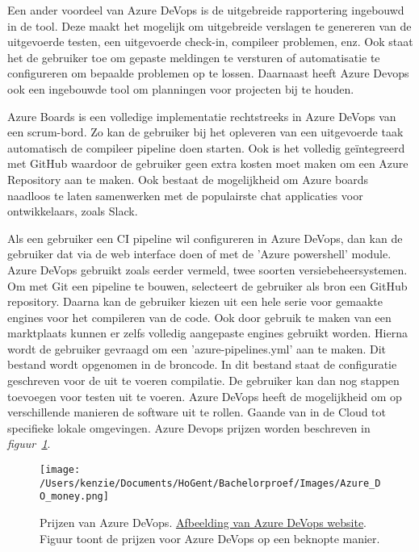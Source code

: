 Een ander voordeel van Azure DeVops is de uitgebreide rapportering ingebouwd in de tool. Deze maakt het mogelijk om uitgebreide verslagen te genereren van de uitgevoerde testen, een uitgevoerde check-in, compileer problemen, enz. Ook staat het de gebruiker toe om gepaste meldingen te versturen of automatisatie te configureren om bepaalde problemen op te lossen. Daarnaast heeft Azure Devops ook een ingebouwde tool om planningen voor projecten bij te houden.

Azure Boards is een volledige implementatie rechtstreeks in Azure DeVops van een scrum-bord. Zo kan de gebruiker bij het opleveren van een uitgevoerde taak automatisch de compileer pipeline doen starten. Ook is het volledig geïntegreerd met GitHub waardoor de gebruiker geen extra kosten moet maken om een Azure Repository aan te maken. Ook bestaat de mogelijkheid om Azure boards naadloos te laten samenwerken met de populairste chat applicaties voor ontwikkelaars, zoals Slack.

Als een gebruiker een CI pipeline wil configureren in Azure DeVops, dan kan de gebruiker dat via de web interface doen of met de 'Azure powershell' module. Azure DeVops gebruikt zoals eerder vermeld, twee soorten versiebeheersystemen. Om met Git een pipeline te bouwen, selecteert de gebruiker als bron een GitHub repository. Daarna kan de gebruiker kiezen uit een hele serie voor gemaakte engines voor het compileren van de code. Ook door gebruik te maken van een marktplaats kunnen er zelfs volledig aangepaste engines gebruikt worden. Hierna wordt de gebruiker gevraagd om een 'azure-pipelines.yml' aan te maken. Dit bestand wordt opgenomen in de broncode. In dit bestand staat de configuratie geschreven voor de uit te voeren compilatie. De gebruiker kan dan nog stappen toevoegen voor testen uit te voeren. Azure DeVops heeft de mogelijkheid om op verschillende manieren de software uit te rollen. Gaande van in de Cloud tot specifieke lokale omgevingen. Azure Devops prijzen worden beschreven in \emph{figuur~\ref{fig:A_DO_Money}}.

\begin{figure}[!htbp]
    \centering
    \texttt{[image: /Users/kenzie/Documents/HoGent/Bachelorproef/Images/Azure\_DO\_money.png]}
    \caption{Prijzen van Azure DeVops. \href{https://azure.microsoft.com/nl-nl/pricing/details/devops/azure-devops-services/}{Afbeelding van Azure DeVops website}. Figuur toont de prijzen voor Azure DeVops op een beknopte manier.}
    \label{fig:A_DO_Money}
\end{figure}

